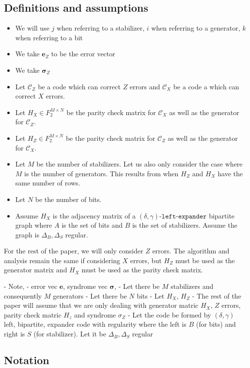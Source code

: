 \newcommand{\vecError}{\boldsymbol{e}_Z}
\newcommand{\vecSigma}{\boldsymbol{\sigma}_Z}
\newcommand{\matrixGenerator}{H_X}
\newcommand{\matrixParity}{H_Z}
\newcommand{\codeZ}{\mathcal{C}_Z}
\newcommand{\codeX}{\mathcal{C}_X}
\newcommand{\leftExpander}{(\delta, \gamma)\texttt{-left-expander}}
\newcommand{\NStablizer}{M}
\newcommand{\NBits}{N}
\newcommand{\MatrixField}{F_2^{\NStablizer \times \NBits}}
\newcommand{\RegularBit}{\Delta_{B}}
\newcommand{\RegularStab}{\Delta_{S}}

\subsection*{Definitions and assumptions}

\begin{itemize}
	\item We will use $j$ when referring to a stabilizer, $i$ when referring to a generator, $k$ when referring to a bit
	\item We take $\vecError$ to be the error vector
	\item We take $\vecSigma$
	\item Let $\codeZ$ be a code which can correct $Z$ errors and $\codeX$ be a code a which can correct $X$ errors.
	\item Let $H_X \in \MatrixField$ be the parity check matrix for $\codeX$ as well as the generator for $\codeZ$. 
	\item Let $H_Z \in \MatrixField$ be the parity check matrix for $\codeZ$ as well as the generator for $\codeX$.
	\item Let $\NStablizer$ be the number of stabilizers. Let us also only consider the case where $\NStablizer$ is the number of generators.
		This results from when $H_Z$ and $H_X$ have the same number of rows.
	\item Let $\NBits$ be the number of bits.
	\item Assume $\matrixGenerator$ is the adjacency matrix of a $\leftExpander$ bipartite graph where $A$ is the set of bits
		and $B$ is the set of stabilizers. Assume the graph is $\RegularBit, \RegularStab$ regular.
\end{itemize}

For the rest of the paper, we will only consider $Z$ errors. The algorithm and analysis remain the same 
if considering $X$ errors, but $H_Z$ must be used as the generator matrix and $H_X$ must be used as the parity check matrix.

- Note, 
- error vec $\bm{e}$, syndrome vec $\bm{\sigma}$,
- Let there be $M$ stabilizers and consequently $M$ generators
- Let there be $N$ bits
- Let $H_X$, $H_Z$
- The rest of the paper will assume that we are only dealing with generator matric $H_X$, $Z$ errors, parity check matric $H_z$ and syndrome $\sigma_Z$
- Let the code be formed by $(\delta, \gamma)$ left, bipartite, expander code with regularity where the left is $B$ (for bits) and right is $S$ (for stabilizer). Let it be $\Delta_B, \Delta_S$ regular

\subsection*{Notation}
